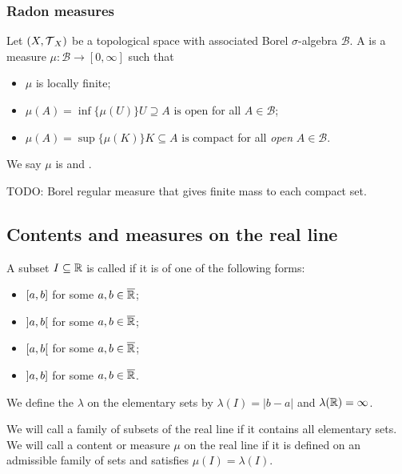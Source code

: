 \subsubsection{Radon measures}
\begin{definition}
Let $\left( X, \operatorname{\mathcal{T}}_X \right)$ be a topological space with associated Borel $\sigma$-algebra $\mathcal{B}$. A  is a measure $\mu: \mathcal{B}\to [0,\infty]$ such that
\begin{itemize}
\item $\mu$ is locally finite;
\item $\mu(A) = \inf\{\mu(U)\}{\text{$U\supseteq A$ is open}}$ for all $A\in \mathcal{B}$;
\item $\mu(A) = \sup\{\mu(K)\}{\text{$K\subseteq A$ is compact}}$ for all \emph{open} $A\in \mathcal{B}$.
\end{itemize}
We say $\mu$ is  and .
\end{definition}

TODO: Borel regular measure that gives finite mass to each compact set.

\subsection{Contents and measures on the real line}
\begin{definition}
A subset $I\subseteq \mathbb{R}$ is called  if it is of one of the following forms:
\begin{itemize}
\item $\interval[c]{a,b}$ for some $a,b\in \overline{\mathbb{R}}$;
\item $\interval[o]{a,b}$ for some $a,b\in \overline{\mathbb{R}}$;
\item $\interval[co]{a,b}$ for some $a,b\in \overline{\mathbb{R}}$;
\item $\interval[oc]{a,b}$ for some $a,b\in \overline{\mathbb{R}}$.
\end{itemize}
We define the  $\lambda$ on the elementary sets by $\lambda(I) = |b-a|$ and $\lambda(\mathbb{R}) = \infty$.

We will call a family of subsets of the real line  if it contains all elementary sets. We will call a content or measure $\mu$ on the real line  if it is defined on an admissible family of sets and satisfies $\mu(I) = \lambda(I)$.
\end{definition}

